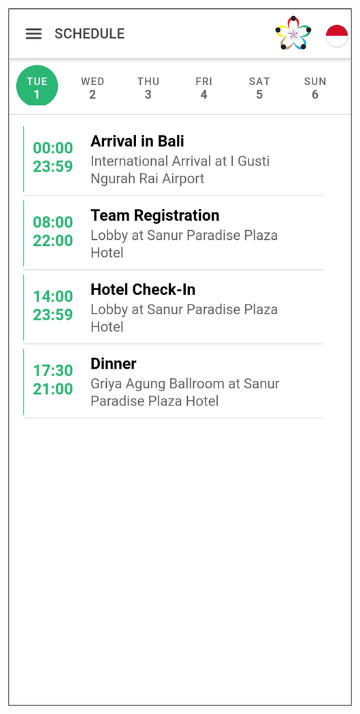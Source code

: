 \begin{figure}[H]
     \centering
     \begin{subfigure}[b]{0.3\textwidth}
         \centering
         \includegraphics[width=\textwidth]{Gambar/SSSchedule.png}

\end{subfigure}
\end{figure}

